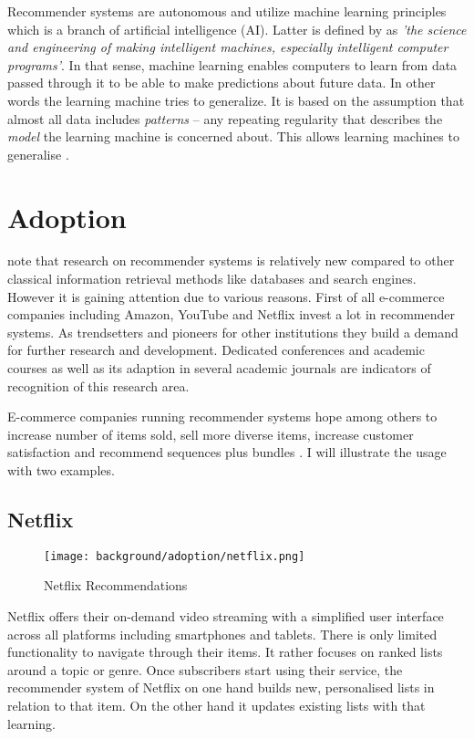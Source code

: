 Recommender systems are autonomous and utilize machine learning principles which is a branch of artificial intelligence (AI). Latter is defined by \citet{mccarthy07} as \textit{'the science and engineering of making intelligent machines, especially intelligent computer programs'}. In that sense, machine learning enables computers to learn from data passed through it to be able to make predictions about future data. In other words the learning machine tries to generalize. It is based on the assumption that almost all data includes \textit{patterns} -- any repeating regularity that describes the \textit{model} the learning machine is concerned about. This allows learning machines to generalise \cite{segaran07}.\label{bg-def-machinelearning}



\section{Adoption}

\citet{ricci11} note that research on recommender systems is relatively new compared to other classical information retrieval methods like databases and search engines. However it is gaining attention due to various reasons. First of all e-commerce companies including Amazon, YouTube and Netflix invest a lot in recommender systems. As trendsetters and pioneers for other institutions they build a demand for further research and development. Dedicated conferences and academic courses as well as its adaption in several academic journals are indicators of recognition of this research area.

E-commerce companies running recommender systems hope among others to increase number of items sold, sell more diverse items, increase customer satisfaction and recommend sequences plus bundles \cite{ricci11}. I will illustrate the usage with two examples.

\subsection{Netflix}

\begin{figure}[ht]
    \texttt{[image: background/adoption/netflix.png]}
    \caption{Netflix Recommendations}
    \label{fig:netflix}
\end{figure}

Netflix offers their on-demand video streaming with a simplified user interface across all platforms including smartphones and tablets. There is only limited functionality to navigate through their items. It rather focuses on ranked lists around a topic or genre. Once subscribers start using their service, the recommender system of Netflix on one hand builds new, personalised lists in relation to that item. On the other hand it updates existing lists with that learning.

